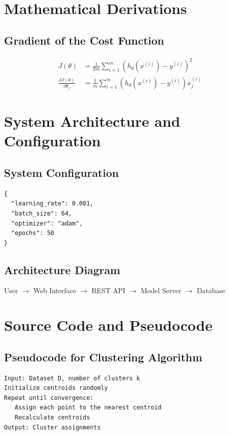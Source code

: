 \documentclass[a4paper,11pt]{report}
\begin{document}
\chapter{Mathematical Derivations}
\label{appendix:mathproofs}

\section*{Gradient of the Cost Function}
\begin{align*}
J(\theta) &= \frac{1}{2m} \sum_{i=1}^{m} (h_\theta(x^{(i)}) - y^{(i)})^2 \\
\frac{\partial J(\theta)}{\partial \theta_j} &= \frac{1}{m} \sum_{i=1}^{m} (h_\theta(x^{(i)}) - y^{(i)}) x_j^{(i)}
\end{align*}

\chapter{System Architecture and Configuration}
\label{appendix:architecture}

\section*{System Configuration}
\begin{verbatim}
{
  "learning_rate": 0.001,
  "batch_size": 64,
  "optimizer": "adam",
  "epochs": 50
}
\end{verbatim}

\section*{Architecture Diagram}
\begin{center}
User $\rightarrow$ Web Interface $\rightarrow$ REST API $\rightarrow$ Model Server $\rightarrow$ Database
\end{center}

\chapter{Source Code and Pseudocode}
\label{appendix:code}

\section*{Pseudocode for Clustering Algorithm}
\begin{verbatim}
Input: Dataset D, number of clusters k
Initialize centroids randomly
Repeat until convergence:
   Assign each point to the nearest centroid
   Recalculate centroids
Output: Cluster assignments
\end{verbatim}
\end{document}
